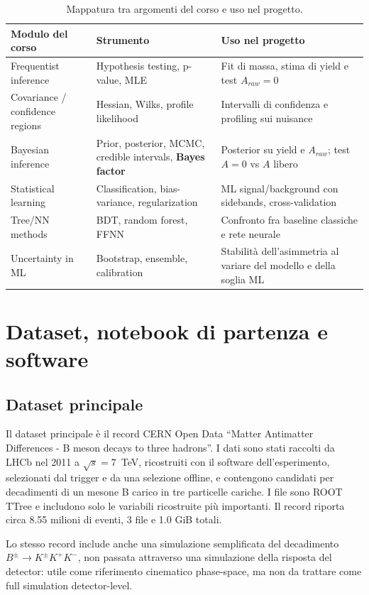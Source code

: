 \documentclass[11pt,a4paper]{article}
\begin{document}
\begin{table}[h!]
\centering
\begin{tabular}{L{3.6cm} L{4cm} L{5.3cm}}
\toprule
\textbf{Modulo del corso} & \textbf{Strumento} & \textbf{Uso nel progetto} \\
\midrule
Frequentist inference & Hypothesis testing, p-value, MLE & Fit di massa, stima di yield e test $A_{raw}=0$ \\
Covariance / confidence regions & Hessian, Wilks, profile likelihood & Intervalli di confidenza e profiling sui nuisance \\
Bayesian inference & Prior, posterior, MCMC, credible intervals, \textbf{Bayes factor} & Posterior su yield e $A_{raw}$; test $A=0$ vs $A$ libero \\
Statistical learning & Classification, bias-variance, regularization & ML signal/background con sidebands, cross-validation \\
Tree/NN methods & BDT, random forest, FFNN & Confronto fra baseline classiche e rete neurale \\
Uncertainty in ML & Bootstrap, ensemble, calibration & Stabilità dell'asimmetria al variare del modello e della soglia ML \\
\bottomrule
\end{tabular}
\caption{Mappatura tra argomenti del corso e uso nel progetto.}
\end{table}

\section{Dataset, notebook di partenza e software}

\subsection*{Dataset principale}
Il dataset principale è il record CERN Open Data ``Matter Antimatter Differences - B meson decays to three hadrons''. I dati sono stati raccolti da LHCb nel 2011 a $\sqrt{s}=7$~TeV, ricostruiti con il software dell'esperimento, selezionati dal trigger e da una selezione offline, e contengono candidati per decadimenti di un mesone B carico in tre particelle cariche. I file sono ROOT TTree e includono solo le variabili ricostruite più importanti. Il record riporta circa 8.55 milioni di eventi, 3 file e 1.0 GiB totali.

Lo stesso record include anche una simulazione semplificata del decadimento $B^{\pm} \to K^{\pm} K^{+} K^{-}$, non passata attraverso una simulazione della risposta del detector: utile come riferimento cinematico phase-space, ma non da trattare come full simulation detector-level.
\end{document}
